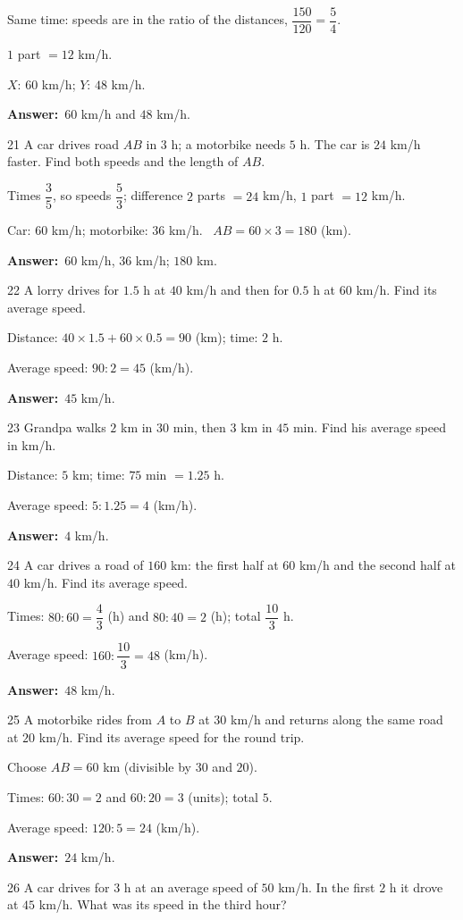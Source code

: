\documentclass[11pt]{article}
\newif\ifsol \solfalse
\providecommand{\AnsWord}{Đáp số}
\newcommand{\dapso}[1]{\par\textbf{\AnsWord:}\ #1}
\newcommand{\probsol}[1]{%
  \begin{lrbox}{\solmeasure}\begin{minipage}{\dimexpr\linewidth-24pt\relax}#1\end{minipage}\end{lrbox}%
  \ifsol
    \begin{solbox}#1\end{solbox}%
  \else
    \setlength{\solht}{\dimexpr\ht\solmeasure+\dp\solmeasure+0.85cm\relax}%
    \ifdim\solht<1.35cm\setlength{\solht}{1.35cm}\fi
    \begin{tcolorbox}[colback=white,colframe=Line,boxrule=0.8pt,arc=5pt,
      left=8pt,right=8pt,top=4pt,bottom=4pt,height=\solht]{\footnotesize\color{Slate}\itshape\WorkWord}\end{tcolorbox}%
  \fi}
\newcommand{\gap}{\vspace{0.3cm}}
\def\WorkWord{Your work:}
\def\AnsWord{Answer}
\begin{document}
\probsol{
Same time: speeds are in the ratio of the distances, $\dfrac{150}{120}=\dfrac54$.\par $1$ part $=12$ km/h.\par $X$: $60$ km/h; $Y$: $48$ km/h.
\dapso{$60$ km/h and $48$ km/h.}}
\gap
\begin{probbox}{21}{\relax}
A car drives road $AB$ in $3$ h; a motorbike needs $5$ h. The car is $24$ km/h faster. Find both speeds and the length of $AB$.
\end{probbox}
\probsol{
Times $\dfrac35$, so speeds $\dfrac53$; difference $2$ parts $=24$ km/h, $1$ part $=12$ km/h.\par
Car: $60$ km/h; motorbike: $36$ km/h. \ $AB=60\times3=180$ (km).
\dapso{$60$ km/h, $36$ km/h; $180$ km.}}
\gap
\begin{probbox}{22}{\relax}
A lorry drives for $1.5$ h at $40$ km/h and then for $0.5$ h at $60$ km/h. Find its average speed.
\end{probbox}
\probsol{
Distance: $40\times1.5+60\times0.5=90$ (km); time: $2$ h.\par Average speed: $90:2=45$ (km/h).
\dapso{$45$ km/h.}}
\gap
\begin{probbox}{23}{\relax}
Grandpa walks $2$ km in $30$ min, then $3$ km in $45$ min. Find his average speed in km/h.
\end{probbox}
\probsol{
Distance: $5$ km; time: $75$ min $=1.25$ h.\par Average speed: $5:1.25=4$ (km/h).
\dapso{$4$ km/h.}}
\gap
\begin{probbox}{24}{\relax}
A car drives a road of $160$ km: the first half at $60$ km/h and the second half at $40$ km/h. Find its average speed.
\end{probbox}
\probsol{
Times: $80:60=\dfrac43$ (h) and $80:40=2$ (h); total $\dfrac{10}3$ h.\par Average speed: $160:\dfrac{10}3=48$ (km/h).
\dapso{$48$ km/h.}}
\gap
\begin{probbox}{25}{\relax}
A motorbike rides from $A$ to $B$ at $30$ km/h and returns along the same road at $20$ km/h. Find its average speed for the round trip.
\end{probbox}
\probsol{
Choose $AB=60$ km (divisible by $30$ and $20$).\par Times: $60:30=2$ and $60:20=3$ (units); total $5$.\par
Average speed: $120:5=24$ (km/h).
\dapso{$24$ km/h.}}
\gap
\begin{probbox}{26}{\relax}
A car drives for $3$ h at an average speed of $50$ km/h. In the first $2$ h it drove at $45$ km/h. What was its speed in the third hour?
\end{probbox}
\end{document}
